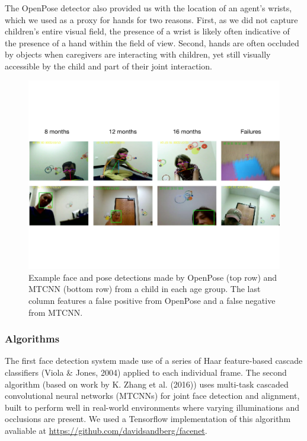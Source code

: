 \documentclass[english,man,floatsintext,draftall]{apa6}
\begin{document}
The OpenPose detector also provided us with the location of an agent's
wrists, which we used as a proxy for hands for two reasons. First, as we
did not capture children's entire visual field, the presence of a wrist
is likely often indicative of the presence of a hand within the field of
view. Second, hands are often occluded by objects when caregivers are
interacting with children, yet still visually accessible by the child
and part of their joint interaction.

\begin{figure}
\centering
\includegraphics[width=5.5in]{images/detector_samples_banner.pdf}
\caption{\label{fig:frames} Example face and pose detections made by OpenPose (top row) and MTCNN (bottom row) from a child in each age group. The last column features a false positive from OpenPose and a false negative from MTCNN.}
\end{figure}

\subsubsection{Algorithms}\label{algorithms}

The first face detection system made use of a series of Haar
feature-based cascade classifiers (Viola \& Jones, 2004) applied to each
individual frame. The second algorithm (based on work by K. Zhang et al.
(2016)) uses multi-task cascaded convolutional neural networks (MTCNNs)
for joint face detection and alignment, built to perform well in
real-world environments where varying illuminations and occlusions are
present. We used a Tensorflow implementation of this algorithm avaliable
at \url{https://github.com/davidsandberg/facenet}.
\end{document}
